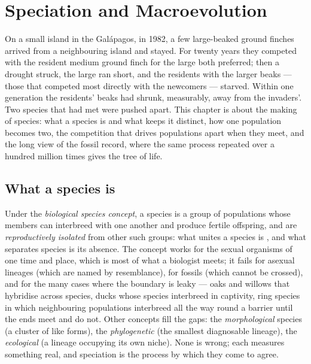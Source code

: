 \chapter{Speciation and Macroevolution}\label{ch:b2:speciation}

On a small island in the Galápagos, in 1982, a few large-beaked
ground finches arrived from a neighbouring island and stayed. For
twenty years they competed with the resident medium ground finch
for the large  both preferred; then a drought struck, the
large  ran short, and the residents with the larger beaks ---
those that competed most directly with the newcomers --- starved.
Within one generation the residents' beaks had shrunk, measurably,
away from the invaders'. Two species that had met were pushed
apart. This chapter is about the making of species: what a species
is and what keeps it distinct, how one population becomes two, the
competition that drives populations apart when they meet, and the
long view of the fossil record, where the same process repeated
over a hundred million times gives the tree of life.

\section{What a species is}

\begin{definition}[Species]\label{def:b2:speciation:species}
Under the \emph{biological species concept}, a species is a group
of populations whose members can interbreed with one another and
produce fertile offspring, and are \emph{reproductively isolated}
from other such groups: what unites a species is , and
what separates species is its absence. The concept works for the
sexual organisms of one time and place, which is most of what a
biologist meets; it fails for asexual lineages (which are named by
resemblance), for fossils (which cannot be crossed), and for the
many cases where the boundary is leaky --- oaks and willows that
hybridise across species, ducks whose species interbreed in
captivity, ring species in which neighbouring populations
interbreed all the way round a barrier until the ends meet and do
not. Other concepts fill the gaps: the \emph{morphological} species
(a cluster of like forms), the \emph{phylogenetic} (the smallest
diagnosable lineage), the \emph{ecological} (a lineage occupying
its own niche). None is wrong; each measures something real, and
speciation is the process by which they come to agree.
\end{definition}

